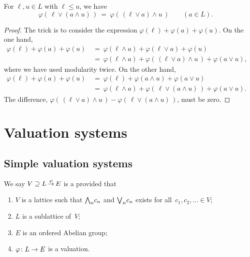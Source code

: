 \documentclass[main.tex]{subfiles}
\begin{document}
%
%
\begin{lem}
\label{L:modular-map-modular}
For $\ell,u\in L$ with $\ell\leq u$, we have
\begin{equation}
\label{eq:modular-map}
\varphi(\,\ell \vee (a \wedge u)\,) 
\ =\ 
\varphi(\,(\ell\vee a)\wedge u\,)
\qquad (a\in L).
\end{equation}
\begin{proof}
The trick is to consider the expression 
$\varphi(\ell) + \varphi(a) + \varphi(u)$.
On the one hand,
\begin{align*}
\varphi(\ell) + \varphi(a) + \varphi(u)
\ &=\ \varphi(\ell\wedge a) + \varphi(\ell \vee a) + \varphi(u) \\
\ &=\ \varphi(\ell \wedge a)
      + \varphi(\,(\ell\vee a)\wedge u\,)
      + \varphi(a\vee u),
\end{align*}
where we have used modularity twice.
On the other hand,
\begin{align*}
\varphi(\ell) + \varphi(a) + \varphi(u)
\ &=\ \varphi(\ell) + \varphi(a\wedge u) + \varphi(a \vee u) \\
\ &=\ \varphi(\ell \wedge a)
      + \varphi(\,\ell\vee (a\wedge u)\,)
      + \varphi(a\vee u).
\end{align*}
The difference,
$\varphi(\,(\ell\vee a)\wedge u\,)
- \varphi(\,\ell\vee (a\wedge u)\,)$,
must be zero.
\end{proof}
\end{lem}



\section{Valuation systems}
\subsection{Simple valuation systems}
%
%
\begin{dfn}
\label{D:simple-system}
We say $V \supseteq L\,\smash{\stackrel{\varphi}{\rightarrow}}\,E$
 is a 
provided that
\begin{enumerate}
\item \label{D:simple-system-1}
$V$ is a lattice
such that $\textstyle{\bigwedge}_n c_n$ and $\textstyle{\bigvee}_n c_n$ exists for all~$c_1,c_2,\dotsc\in V$;
\item \label{D:simple-system-2}
$L$ is a sublattice of~$V$;
\item \label{D:simple-system-3}
$E$ is an ordered Abelian group;
\item \label{D:simple-system-4}
$\varphi\colon L\rightarrow E$ is a valuation.
\end{enumerate}
\end{dfn}
\end{document}
